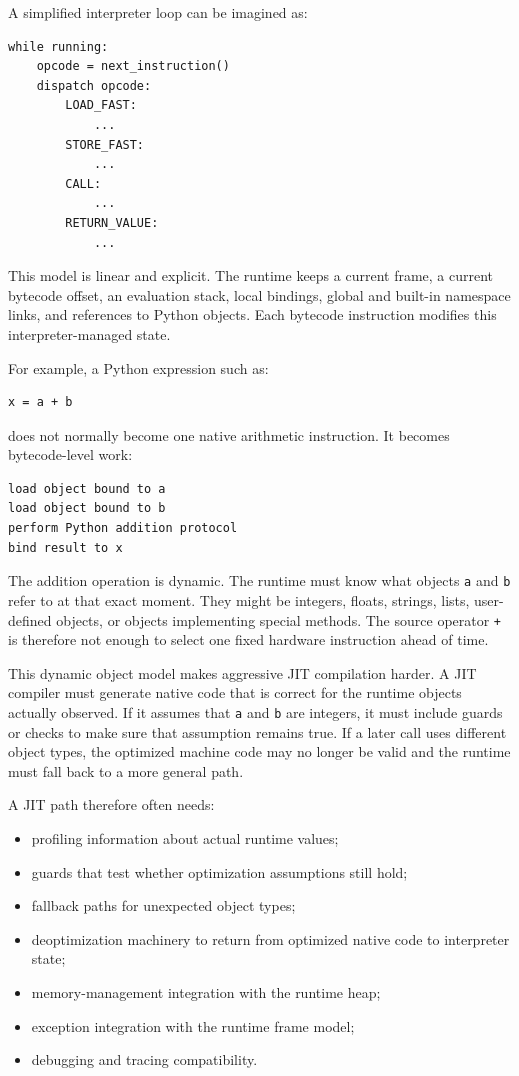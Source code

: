 A simplified interpreter loop can be imagined as:

\begin{verbatim}
while running:
    opcode = next_instruction()
    dispatch opcode:
        LOAD_FAST:
            ...
        STORE_FAST:
            ...
        CALL:
            ...
        RETURN_VALUE:
            ...
\end{verbatim}

This model is linear and explicit. The runtime keeps a current frame, a current bytecode offset, an evaluation stack, local bindings, global and built-in namespace links, and references to Python objects. Each bytecode instruction modifies this interpreter-managed state.

For example, a Python expression such as:

\begin{verbatim}
x = a + b
\end{verbatim}

does not normally become one native arithmetic instruction. It becomes bytecode-level work:

\begin{verbatim}
load object bound to a
load object bound to b
perform Python addition protocol
bind result to x
\end{verbatim}

The addition operation is dynamic. The runtime must know what objects \texttt{a} and \texttt{b} refer to at that exact moment. They might be integers, floats, strings, lists, user-defined objects, or objects implementing special methods. The source operator \texttt{+} is therefore not enough to select one fixed hardware instruction ahead of time.

This dynamic object model makes aggressive JIT compilation harder. A JIT compiler must generate native code that is correct for the runtime objects actually observed. If it assumes that \texttt{a} and \texttt{b} are integers, it must include guards or checks to make sure that assumption remains true. If a later call uses different object types, the optimized machine code may no longer be valid and the runtime must fall back to a more general path.

A JIT path therefore often needs:

\begin{itemize}
    \item profiling information about actual runtime values;
    \item guards that test whether optimization assumptions still hold;
    \item fallback paths for unexpected object types;
    \item deoptimization machinery to return from optimized native code to interpreter state;
    \item memory-management integration with the runtime heap;
    \item exception integration with the runtime frame model;
    \item debugging and tracing compatibility.
\end{itemize}

